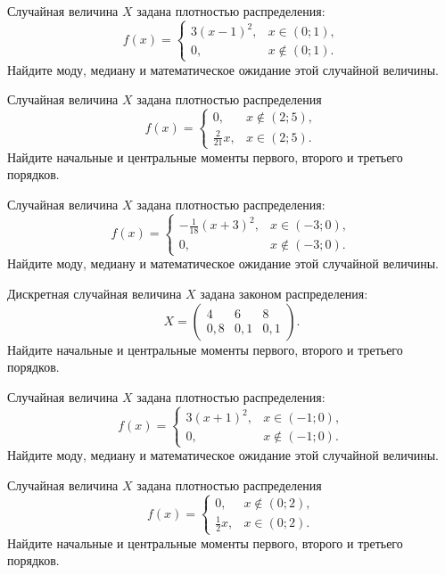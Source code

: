 \vfill

\newpage\setcounter{zad}{0}

\z Случайная величина $X$ задана плотностью распределения: $$f(x) = \begin{cases} 3(x-1)^2, & x \in (0; 1), \\ 0, & x \not\in (0; 1). \end{cases}$$ Найдите моду, медиану и математическое ожидание этой случайной величины.


\vfill

\z Случайная величина $X$ задана плотностью распределения $$f(x) = \begin{cases}0, & x\not\in(2; 5), \\ \frac{2}{21}x, & x\in(2; 5).\end{cases}$$ Найдите начальные и центральные моменты первого, второго и третьего порядков.
 

\vfill

\newpage\setcounter{zad}{0}

\z Случайная величина $X$ задана плотностью распределения: $$f(x) = \begin{cases} -\frac{1}{18}(x+3)^2, & x \in (-3; 0), \\ 0, & x \not\in (-3; 0). \end{cases}$$ Найдите моду, медиану и математическое ожидание этой случайной величины.


\vfill

\z Дискретная случайная величина $X$ задана законом распределения: $$ X = \left(\begin{array}{rrr}4 & 6 & 8\\0{,}8 & 0{,}1 & 0{,}1\end{array}\right).$$ Найдите начальные и центральные моменты первого, второго и третьего порядков.
 

\vfill

\newpage\setcounter{zad}{0}

\z Случайная величина $X$ задана плотностью распределения: $$f(x) = \begin{cases} 3(x+1)^2, & x \in (-1; 0), \\ 0, & x \not\in (-1; 0). \end{cases}$$ Найдите моду, медиану и математическое ожидание этой случайной величины.


\vfill

\z Случайная величина $X$ задана плотностью распределения $$f(x) = \begin{cases}0, & x\not\in(0; 2), \\ \frac{1}{2}x, & x\in(0; 2).\end{cases}$$ Найдите начальные и центральные моменты первого, второго и третьего порядков.
 

\vfill

\newpage\setcounter{zad}{0}